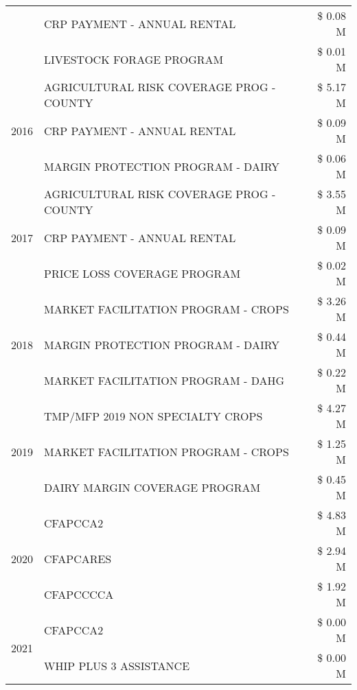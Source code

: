 \begin{tabular}{llr}
 & CRP PAYMENT - ANNUAL RENTAL & \$ 0.08 M \\
 & LIVESTOCK FORAGE PROGRAM & \$ 0.01 M \\
\cline{1-3}
\multirow[t]{3}{*}{2016} & AGRICULTURAL RISK COVERAGE PROG - COUNTY      & \$ 5.17 M \\
 & CRP PAYMENT - ANNUAL RENTAL                   & \$ 0.09 M \\
 & MARGIN PROTECTION PROGRAM - DAIRY             & \$ 0.06 M \\
\cline{1-3}
\multirow[t]{3}{*}{2017} & AGRICULTURAL RISK COVERAGE PROG - COUNTY & \$ 3.55 M \\
 & CRP PAYMENT - ANNUAL RENTAL & \$ 0.09 M \\
 & PRICE LOSS COVERAGE PROGRAM & \$ 0.02 M \\
\cline{1-3}
\multirow[t]{3}{*}{2018} & MARKET FACILITATION PROGRAM - CROPS & \$ 3.26 M \\
 & MARGIN PROTECTION PROGRAM - DAIRY & \$ 0.44 M \\
 & MARKET FACILITATION PROGRAM - DAHG & \$ 0.22 M \\
\cline{1-3}
\multirow[t]{3}{*}{2019} & TMP/MFP 2019 NON SPECIALTY CROPS & \$ 4.27 M \\
 & MARKET FACILITATION PROGRAM - CROPS & \$ 1.25 M \\
 & DAIRY MARGIN COVERAGE PROGRAM & \$ 0.45 M \\
\cline{1-3}
\multirow[t]{3}{*}{2020} & CFAPCCA2 & \$ 4.83 M \\
 & CFAPCARES & \$ 2.94 M \\
 & CFAPCCCCA & \$ 1.92 M \\
\cline{1-3}
\multirow[t]{2}{*}{2021} & CFAPCCA2 & \$ 0.00 M \\
 & WHIP PLUS 3 ASSISTANCE & \$ 0.00 M \\
\cline{1-3}
\bottomrule
\end{tabular}
